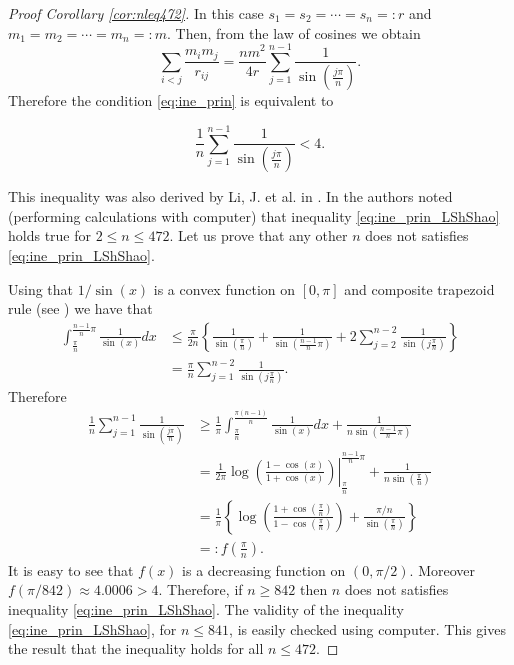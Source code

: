 \documentclass[twoside]{article}
\theoremstyle{remark}
\begin{document}
\begin{proof}[Proof Corollary \ref{cor:nleq472}]
In this case $s_1=s_2=\cdots=s_n=:r$ and $m_1=m_2=\cdots=m_n=:m$. Then, from the law of cosines we obtain
\[
 \sum_{i<j}\frac{m_im_j}{r_{ij}}=\frac{nm^2}{4r}\sum_{j=1}^{n-1}\frac{1}{\sin\left(\frac{j\pi}{n}\right)}.
\]
Therefore the condition \eqref{eq:ine_prin} is equivalent to

\begin{equation}\label{eq:ine_prin_LShShao}
  \frac1n\sum_{j=1}^{n-1}\frac{1}{\sin\left(\frac{j\pi}{n}\right)}<4.
\end{equation}

This inequality was also derived by Li, J. et al. in \cite{li2013characterization}. In \cite{li2013characterization} the authors noted (performing calculations with computer) that inequality \eqref{eq:ine_prin_LShShao} holds true for $2\leq n\leq 472$. Let us prove that any other $n$ does not satisfies \eqref{eq:ine_prin_LShShao}.


Using that $1/\sin (x)$ is a convex function on $[0,\pi]$ and composite trapezoid rule (see \cite{kincaid1991numerical}) we have that
\[
\begin{split}
 \int_{\frac{\pi}{n}}^{\frac{n-1}{n}\pi}\frac{1}{\sin (x)}dx&\leq \frac{\pi}{2n}\left\{ \frac{1}{\sin(\frac{\pi}{n})} + \frac{1}{\sin(\frac{n-1}{n}\pi)} +2\sum_{j=2}^{n-2}\frac{1}{\sin(j\frac{\pi}{n})} \right\}\\
 &=\frac{\pi}{n}\sum_{j=1}^{n-2}\frac{1}{\sin(j\frac{\pi}{n})}.
\end{split}
\]
Therefore
\[
\begin{split}
 \frac1n \sum_{j=1}^{n-1}\frac{1}{\sin\left(\frac{j\pi}{n}\right)}&\geq \frac{1}{\pi}\int_{\frac{\pi}{n}}^{\frac{\pi(n-1)}{n}}\frac{1}{\sin (x)}dx+\frac{1}{n\sin\left(\frac{n-1}{n}\pi\right)}\\
 &=\left.\frac{1}{2\pi}\log \left( \frac{1-\cos(x)}{1+\cos(x)}\right)\right|_{\frac{\pi}{n}}^{\frac{n-1}{n}\pi}+\frac{1}{n\sin\left(\frac{\pi}{n}\right)}\\
 &=\frac{1}{\pi}\left\{\log \left(\frac{1+\cos(\frac{\pi}{n})}{1-\cos(\frac{\pi}{n})}\right)+\frac{\pi/n}{\sin\left(\frac{\pi}{n}\right)}\right\}\\
 &=:f\left(\frac{\pi}{n} \right).
 \end{split}
\]
It is easy to see that $f(x)$ is a decreasing function on $(0,\pi/2)$. Moreover $f(\pi/842)\approx 4.0006>4$. Therefore, if $n\geq 842$ then $n$ does not satisfies inequality \eqref{eq:ine_prin_LShShao}. The validity of the inequality \eqref{eq:ine_prin_LShShao}, for $n\leq 841$, is easily checked using computer. This gives the result that the inequality holds for all $n \leq 472$.
\end{proof}
\end{document}
